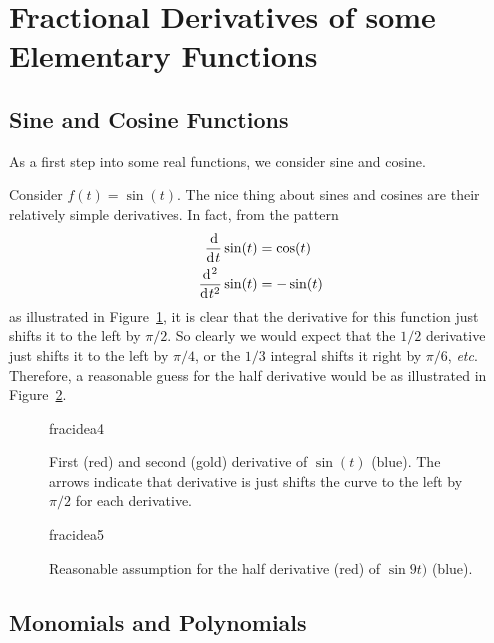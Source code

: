 \section{Fractional Derivatives of some Elementary Functions}
\subsection{Sine and Cosine Functions}
As a first step into some real functions, we consider sine and cosine.

\begin{example}
  Consider $f(t) = \sin(t)$. The nice thing about sines and cosines are their relatively simple derivatives. In fact, from the pattern
  \begin{align*}
    \frac{\operatorname{d}\hspace*{-1pt}}{\operatorname{d}\hspace*{-1pt} t} \sin(t) &= \cos(t) \\
    \frac{\operatorname{d}\hspace*{-1pt}^2}{\operatorname{d}\hspace*{-1pt} t^2} \sin(t) &= -\sin(t)
  \end{align*}
  as illustrated in Figure~\ref{fig:fracidea4}, it is clear that the derivative for this function just shifts it to the left by $\pi/2$. So clearly we would expect that the $1/2$ derivative just shifts it to the left by $\pi/4$, or the $1/3$ integral shifts it right by $\pi/6$, \textit{etc}. Therefore, a reasonable guess for the half derivative would be as illustrated in Figure~\ref{fig:fracidea5}.

  \begin{figure}
    \centering
    {fracidea4}
    \caption{First (red) and second (gold) derivative of $\sin(t)$ (blue). The arrows indicate that derivative is just shifts the curve to the left by $\pi/2$ for each derivative.}
    \label{fig:fracidea4}
  \end{figure}

  \begin{figure}
    \centering
    {fracidea5}
  \caption{Reasonable assumption for the half derivative (red) of $\sin9t)$ (blue).}
  \label{fig:fracidea5}
\end{figure}

\end{example}

\subsection{Monomials and Polynomials}


